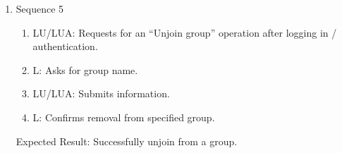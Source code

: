 \documentclass[11pt]{report} %
\begin{document}
\begin{enumerate}
\begin{enumerate}
			\item
				Sequence 5
					\begin{enumerate}
						\item
							LU/LUA: Requests for an ``Unjoin group'' operation after logging in / authentication.
						\item
							L: Asks for group name.
						\item
							LU/LUA: Submits information.
						\item
							L: Confirms removal from specified group.
					\end{enumerate}
				Expected Result: Successfully unjoin from a group.
		\end{enumerate}
\end{enumerate}
\end{document}

